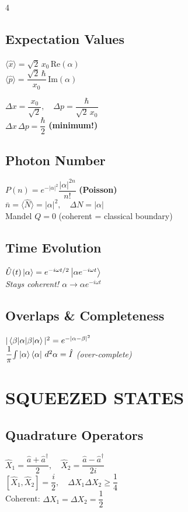 \documentclass[10pt,landscape,a4paper]{article}
\newcommand{\aop}{\hat{a}}
\newcommand{\adop}{\hat{a}^{\dagger}}
\newcommand{\Nop}{\hat{N}}
\newcommand{\xop}{\hat{x}}
\newcommand{\pop}{\hat{p}}
\newcommand{\xzero}{x_0}
\begin{document}
\begin{multicols}{4}
\subsection{Expectation Values}
$\langle\xop\rangle = \sqrt{2}\,\xzero\,\text{Re}(\alpha)$\\[2pt]
$\langle\pop\rangle = \dfrac{\sqrt{2}\,\hbar}{\xzero}\,\text{Im}(\alpha)$\\[2pt]
\begin{coherentbox}
$\Delta x = \dfrac{\xzero}{\sqrt{2}},\quad \Delta p = \dfrac{\hbar}{\sqrt{2}\,\xzero}$\\[3pt]
$\Delta x\,\Delta p = \dfrac{\hbar}{2}$ \textbf{(minimum!)}
\end{coherentbox}

\subsection{Photon Number}
$P(n) = e^{-|\alpha|^2}\dfrac{|\alpha|^{2n}}{n!}$ \textbf{(Poisson)}\\[2pt]
$\bar{n} = \langle\Nop\rangle = |\alpha|^2,\quad\Delta N = |\alpha|$\\[2pt]
Mandel $Q = 0$ (coherent = classical boundary)

\subsection{Time Evolution}
\begin{coherentbox}
$\hat{U}(t)\ket{\alpha} = e^{-i\omega t/2}\ket{\alpha e^{-i\omega t}}$\\[2pt]
\textit{Stays coherent! $\alpha\to\alpha e^{-i\omega t}$}
\end{coherentbox}

\subsection{Overlaps \& Completeness}
$|\braket{\beta|\alpha}|^2 = e^{-|\alpha-\beta|^2}$\\[2pt]
$\dfrac{1}{\pi}\!\int\ket{\alpha}\bra{\alpha}\,d^2\alpha = \hat{I}$ \textit{(over-complete)}

\section{SQUEEZED STATES}

\subsection{Quadrature Operators}
$\hat{X}_1 = \dfrac{\aop+\adop}{2},\quad\hat{X}_2 = \dfrac{\aop-\adop}{2i}$\\[2pt]
$[\hat{X}_1,\hat{X}_2] = \dfrac{i}{2},\quad\Delta X_1\Delta X_2\geq\dfrac{1}{4}$\\[2pt]
Coherent: $\Delta X_1 = \Delta X_2 = \dfrac{1}{2}$


\end{multicols}
\end{document}
